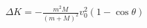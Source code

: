 \documentclass[preview]{standalone}
\begin{document}
\begin{align*}
\Delta K = -\frac{m^2 M}{(m+M)^2}v_0^2(1-\cos\theta)
\end{align*}
\end{document}
